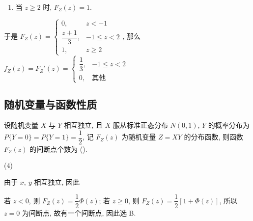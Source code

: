 \begin{solution}
\begin{enumerate}[label=(\arabic{*})]
\begin{enumerate}[label=(\roman{*})]
                  \item 当 $z\geqslant 2$ 时, $F_Z(z)=1.$
              \end{enumerate}
              于是 $F_Z(z)=\begin{cases}
                      0,              & z<-1            \\
                      \dfrac{z+1}{3}, & -1\leqslant z<2 \\[6pt]
                      1,              & z\geqslant 2
                  \end{cases}$, 那么 $f_Z(z)=F_Z'(z)=\begin{cases}
                      \dfrac{1}{3}, & -1\leqslant z<2 \\
                      0,            & \text{其他}
                  \end{cases}$
    \end{enumerate}
\end{solution}

\subsection{随机变量与函数性质}

\begin{example}[2009 数一]
    设随机变量 $ X $ 与 $ Y $ 相互独立, 且 $ X $ 服从标准正态分布 $ N(0,1)$, $ Y $ 的概率分布为 $ P\{Y=0\}=   P\{Y=1\}=\dfrac{1}{2} $, 
    记 $ F_{Z}(z) $ 为随机变量 $ Z=X Y $ 的分布函数, 则函数 $ F_{Z}(z) $ 的间断点个数为 (\quad).
    \begin{tasks}(4)
    \end{tasks}
\end{example}
\begin{solution}
    由于 $x,~y$ 相互独立, 因此
    若 $z<0$, 则 $F_Z(z)=\dfrac{1}{2}\varPhi(z)$; 若 $z\geqslant 0$, 则 $F_Z(z)=\dfrac{1}{2}[1+\varPhi(z)]$, 所以 $z=0$ 为间断点, 故有一个间断点, 因此选 B.
\end{solution}

